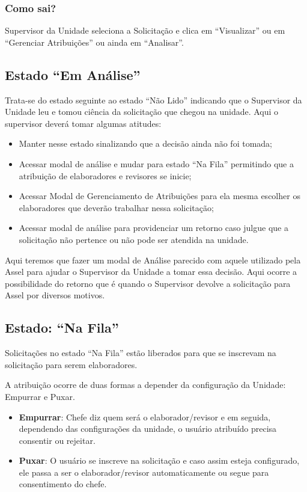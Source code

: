 \subsubsection*{Como sai?}

Supervisor da Unidade seleciona a Solicitação e clica em ``Visualizar'' ou em ``Gerenciar Atribuições'' ou ainda em ``Analisar''.

\subsection{Estado ``Em Análise''}

Trata-se do estado seguinte ao estado ``Não Lido'' indicando que o Supervisor da Unidade leu e tomou ciência da solicitação que chegou na unidade. Aqui o supervisor deverá tomar algumas atitudes:

\begin{itemize}
	\item Manter nesse estado sinalizando que a decisão ainda não foi tomada;
	\item Acessar modal de análise e mudar para estado ``Na Fila'' permitindo que a atribuição de elaboradores e revisores se inicie;
	\item Acessar Modal de Gerenciamento de Atribuições para ela mesma escolher os elaboradores que deverão trabalhar nessa solicitação;
	\item Acessar modal de análise para providenciar um retorno caso julgue que a solicitação não pertence ou não pode ser atendida na unidade.
\end{itemize}

Aqui teremos que fazer um modal de Análise parecido com aquele utilizado pela Assel para ajudar o Supervisor da Unidade a tomar essa decisão. Aqui ocorre a possibilidade do retorno que é quando o Supervisor devolve a solicitação para Assel por diversos motivos.


\subsection{Estado: ``Na Fila''}

Solicitações no estado ``Na Fila'' estão liberados para que \CLs se inscrevam na solicitação para serem elaboradores.

A atribuição ocorre de duas formas a depender da configuração da Unidade: Empurrar e Puxar.

\begin{itemize}
	\item \textbf{Empurrar}: Chefe diz quem será o elaborador/revisor e em seguida, dependendo das configurações da unidade, o usuário atribuído precisa consentir ou rejeitar. 
	
	\item \textbf{Puxar}: O usuário se inscreve na solicitação e caso assim esteja configurado, ele	passa a ser o elaborador/revisor automaticamente ou segue para consentimento do chefe.
\end{itemize}


